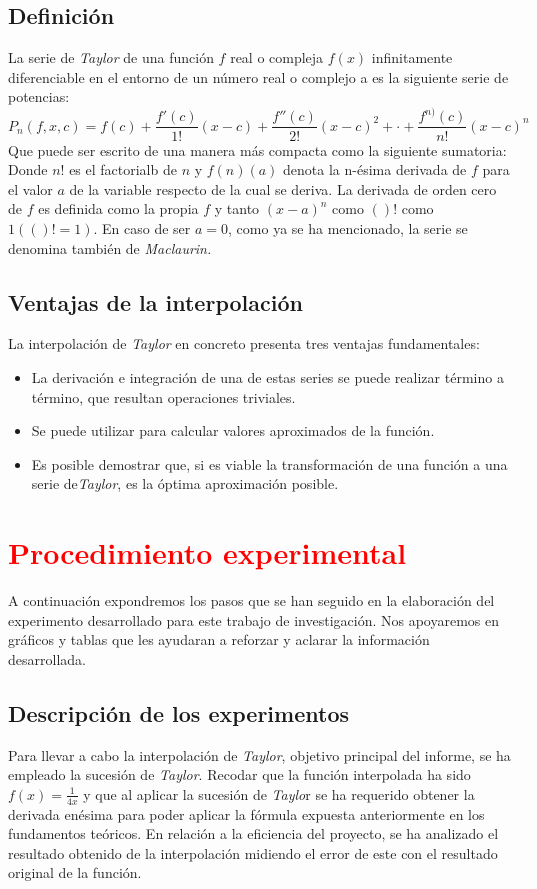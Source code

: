 \documentclass[a4paper,12pt]{article}
\begin{document}
\subsection{Definición}
La serie de {\em Taylor} de una función $f$ real o compleja $f(x)$ infinitamente diferenciable en el entorno de un número real o complejo a es la siguiente serie de potencias:
$$P_n(f,x,c)=f(c)+\frac{f'(c)}{1!}(x-c)+\frac{f''(c)}{2!}(x-c)^2+\cdot+\frac{f^{n)}(c)}{n!}(x-c)^n$$
Que puede ser escrito de una manera más compacta como la siguiente sumatoria:
Donde $n!$ es el factorialb de $n$ y $f(n)(a)$ denota la n-ésima derivada de $f$ para el valor $a$ de la variable respecto de la cual se deriva. La derivada de orden cero de $f$ es definida como la propia $f$ y tanto
$\left({x-a}\right)^n$ como $()!$ como $1 (()! = 1)$. En caso de ser $a= 0$, como ya se ha mencionado, la serie se denomina también de {\em Maclaurin.}
\subsection{Ventajas de la interpolación}
La interpolación de {\em Taylor} en concreto presenta tres ventajas fundamentales:
\begin{itemize}

 \item La derivación e integración de una de estas series se puede realizar término a término, que resultan operaciones triviales.
 \item Se puede utilizar para calcular valores aproximados de la función.
 \item Es posible demostrar que, si es viable la transformación de una función a una serie de{\em  Taylor}, es la óptima aproximación posible.
\end{itemize}
\newpage
\section{\textcolor{red}{Procedimiento experimental}}
A continuación expondremos los pasos que se han seguido en la elaboración del experimento desarrollado para este trabajo de investigación. 
Nos apoyaremos en gráficos y tablas que les ayudaran a reforzar y aclarar la información desarrollada.
\subsection{Descripción de los experimentos}
Para llevar a cabo la interpolación de {\em Taylor}, objetivo principal del informe, se ha empleado la sucesión de {\em Taylor}. Recodar que  la función interpolada ha sido $f(x)=\frac{1}{4x}$  y que al aplicar la sucesión de {\em Taylo}r se ha requerido obtener la derivada enésima para poder aplicar la fórmula expuesta anteriormente en los fundamentos teóricos. 
En relación a la eficiencia del proyecto, se ha analizado el resultado obtenido de la interpolación midiendo el error de este con el resultado original de la función.  
\end{document}
